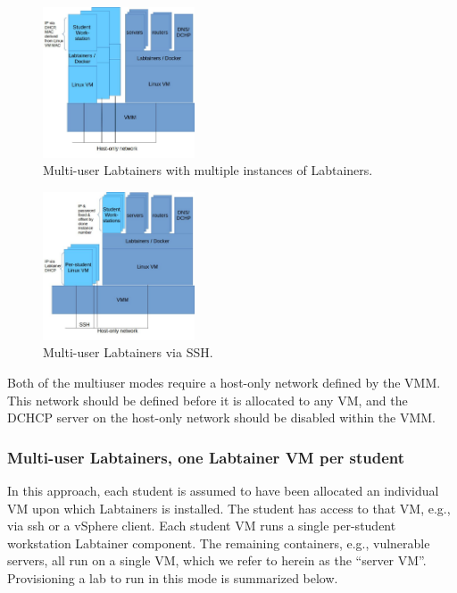 \documentclass[12pt]{article}
\begin{document}
\begin{figure}[H]
\centering
\includegraphics[width=0.4\textwidth]{multiuser-multilabtainers.jpg}
\caption{Multi-user Labtainers with multiple instances of Labtainers.}
\label{fig:multi-multi}
\end{figure}

\begin{figure}[H]
\centering
\includegraphics[width=0.4\textwidth]{multiuser-onelabtainer.jpg}
\caption{Multi-user Labtainers via SSH.}
\label{fig:multi-single}
\end{figure}

Both of the multiuser modes require a host-only network defined by the VMM.  This network should be defined
before it is allocated to any VM, and the DCHCP server on the host-only network should be disabled within 
the VMM.  

\subsubsection {Multi-user Labtainers, one Labtainer VM per student}
In this approach, each student is assumed to have been allocated an
individual VM upon which Labtainers is installed.
The student has access to that VM, e.g., via ssh or a vSphere client.  
Each student VM runs a single per-student workstation Labtainer component.
The remaining containers, e.g., vulnerable servers, all run on a single VM,
which we refer to herein as the ``server VM''.  Provisioning a lab to run
in this mode is summarized below.
\end{document}
